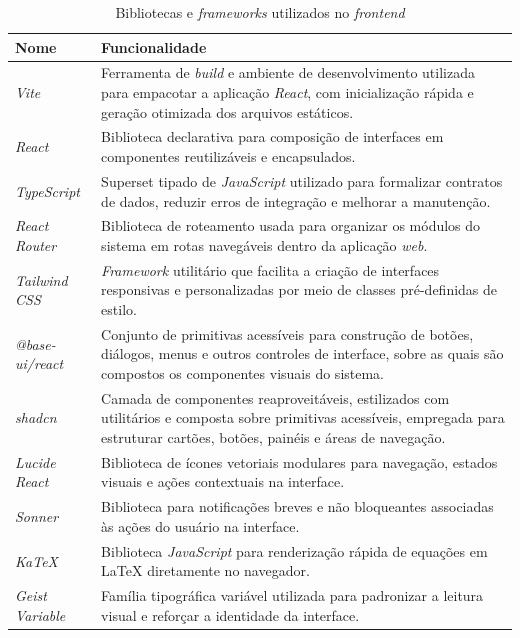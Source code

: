 \begin{table}[H]
\centering
\caption{Bibliotecas e \textit{frameworks} utilizados no \textit{frontend}}
\label{tab:frontend_libs}
\begin{tabular}{|>{\raggedright\arraybackslash}p{}|>{\raggedright\arraybackslash}p{}|}
\hline
\textbf{Nome} & \textbf{Funcionalidade} \\ \hline
\textit{Vite} & Ferramenta de \textit{build} e ambiente de desenvolvimento utilizada para empacotar a aplicação \textit{React}, com inicialização rápida e geração otimizada dos arquivos estáticos. \\ \hline
\textit{React} & Biblioteca declarativa para composição de interfaces em componentes reutilizáveis e encapsulados. \\ \hline
\textit{TypeScript} & Superset tipado de \textit{JavaScript} utilizado para formalizar contratos de dados, reduzir erros de integração e melhorar a manutenção. \\ \hline
\textit{React Router} & Biblioteca de roteamento usada para organizar os módulos do sistema em rotas navegáveis dentro da aplicação \textit{web}. \\ \hline
\textit{Tailwind CSS} & \textit{Framework} utilitário que facilita a criação de interfaces responsivas e personalizadas por meio de classes pré-definidas de estilo. \\ \hline
\textit{@base-ui/react} & Conjunto de primitivas acessíveis para construção de botões, diálogos, menus e outros controles de interface, sobre as quais são compostos os componentes visuais do sistema. \\ \hline
\textit{shadcn} & Camada de componentes reaproveitáveis, estilizados com utilitários e composta sobre primitivas acessíveis, empregada para estruturar cartões, botões, painéis e áreas de navegação. \\ \hline
\textit{Lucide React} & Biblioteca de ícones vetoriais modulares para navegação, estados visuais e ações contextuais na interface. \\ \hline
\textit{Sonner} & Biblioteca para notificações breves e não bloqueantes associadas às ações do usuário na interface. \\ \hline
\textit{KaTeX} & Biblioteca \textit{JavaScript} para renderização rápida de equações em \LaTeX{} diretamente no navegador. \\ \hline
\textit{Geist Variable} & Família tipográfica variável utilizada para padronizar a leitura visual e reforçar a identidade da interface. \\ \hline
\end{tabular}
\end{table}

